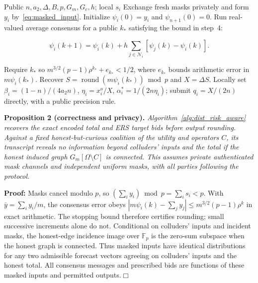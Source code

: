 \documentclass[journal]{IEEEtran}
\begin{document}
\begin{algorithm}[hbt]
\caption{Masked Consensus for the Uncapped ERS Design}
\label{alg:dist_risk_aware}
\begin{algorithmic}[1]
\Require Public $n,a_2,\Delta,B,p,G_m,G_c,h$; local $s_i$
\State Exchange fresh masks privately and form $y_i$ by~\eqref{eq:masked_input}.
\State Initialize $\psi_i(0)=y_i$ and $\psi_{n+1}(0)=0$.
\State Run real-valued average consensus for a public $k_*$ satisfying the bound in step~4:
\end{algorithmic}
\begin{equation}
 \psi_i(k+1)=\psi_i(k)+h\sum_{j\in\mathcal N_i}
 [\psi_j(k)-\psi_i(k)]. \label{eq:psi}
\end{equation}
\begin{algorithmic}[1]
\setcounter{ALG@line}{3}
\State Require $k_*$ so $m^{3/2}(p-1)\rho^{k_*}+e_{k_*}<1/2$, where $e_{k_*}$ bounds arithmetic error in $m\psi_i(k_*)$.
\State Recover $S=\operatorname{round}(m\psi_i(k_*))\bmod p$ and $X=\Delta S$.
\State Locally set $\beta_i=(1-n)/(4a_2n)$, $\eta_i=x_i^o/X$, $\alpha_i^*=1/(2n\eta_i)$; submit $q_i=X/(2n)$ directly, with a public precision rule.
\end{algorithmic}
\end{algorithm}

\noindent\textbf{Proposition 2 (correctness and privacy).}
\textit{Algorithm~\ref{alg:dist_risk_aware} recovers the exact encoded total and ERS target bids before output rounding. Against a fixed honest-but-curious coalition of the utility and operators $C$, its transcript reveals no information beyond colluders' inputs and the total if the honest induced graph $G_m[\Omega\setminus C]$ is connected. This assumes private authenticated mask channels and independent uniform masks, with all parties following the protocol.}

\noindent\textbf{Proof:} Masks cancel modulo $p$, so $(\sum_i y_i)\bmod p=\sum_i s_i<p$. With $\bar y=\sum_i y_i/m$, the consensus error obeys $|m\psi_i(k)-\sum_jy_j|\leq m^{3/2}(p-1)\rho^k$ in exact arithmetic. The stopping bound therefore certifies rounding; small successive increments alone do not. Conditional on colluders' inputs and incident masks, the honest-edge incidence image over $\mathbb F_p$ is the zero-sum subspace when the honest graph is connected. Thus masked inputs have identical distributions for any two admissible forecast vectors agreeing on colluders' inputs and the honest total. All consensus messages and prescribed bids are functions of these masked inputs and permitted outputs.\hfill$\Box$
\end{document}
